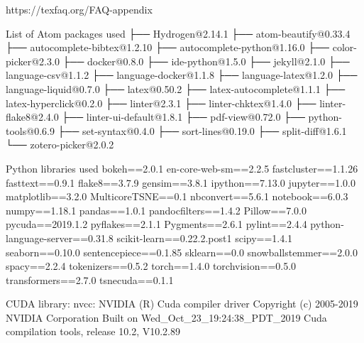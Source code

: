 
https://texfaq.org/FAQ-appendix

List of Atom packages used
├── Hydrogen@2.14.1
├── atom-beautify@0.33.4
├── autocomplete-bibtex@1.2.10
├── autocomplete-python@1.16.0
├── color-picker@2.3.0
├── docker@0.8.0
├── ide-python@1.5.0
├── jekyll@2.1.0
├── language-csv@1.1.2
├── language-docker@1.1.8
├── language-latex@1.2.0
├── language-liquid@0.7.0
├── latex@0.50.2
├── latex-autocomplete@1.1.1
├── latex-hyperclick@0.2.0
├── linter@2.3.1
├── linter-chktex@1.4.0
├── linter-flake8@2.4.0
├── linter-ui-default@1.8.1
├── pdf-view@0.72.0
├── python-tools@0.6.9
├── set-syntax@0.4.0
├── sort-lines@0.19.0
├── split-diff@1.6.1
└── zotero-picker@2.0.2


Python libraries used
bokeh==2.0.1
en-core-web-sm==2.2.5
fastcluster==1.1.26
fasttext==0.9.1
flake8==3.7.9
gensim==3.8.1
ipython==7.13.0
jupyter==1.0.0
matplotlib==3.2.0
MulticoreTSNE==0.1
nbconvert==5.6.1
notebook==6.0.3
numpy==1.18.1
pandas==1.0.1
pandocfilters==1.4.2
Pillow==7.0.0
pycuda==2019.1.2
pyflakes==2.1.1
Pygments==2.6.1
pylint==2.4.4
python-language-server==0.31.8
scikit-learn==0.22.2.post1
scipy==1.4.1
seaborn==0.10.0
sentencepiece==0.1.85
sklearn==0.0
snowballstemmer==2.0.0
spacy==2.2.4
tokenizers==0.5.2
torch==1.4.0
torchvision==0.5.0
transformers==2.7.0
tsnecuda==0.1.1


CUDA library:
nvcc: NVIDIA (R) Cuda compiler driver
Copyright (c) 2005-2019 NVIDIA Corporation
Built on Wed_Oct_23_19:24:38_PDT_2019
Cuda compilation tools, release 10.2, V10.2.89
